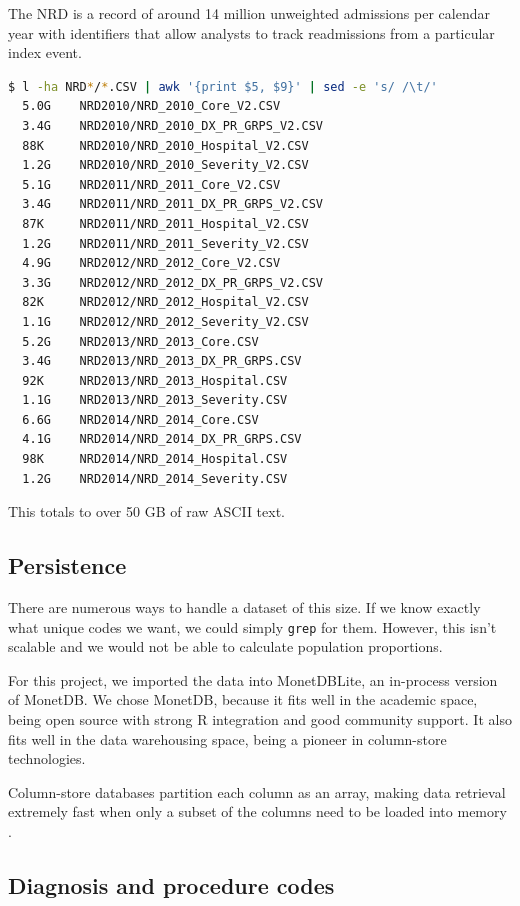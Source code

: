 \documentclass[12pt]{ociamthesis}\usepackage[]{graphicx}\usepackage[]{color}
\begin{document}
The NRD is a record of around 14 million unweighted admissions per calendar year with identifiers that allow analysts 
to track readmissions from a particular index event.

\begin{lstlisting}[language=Bash,caption={Showing file sizes for the NRD dataset from 2010-2014},captionpos=b]
  $ l -ha NRD*/*.CSV | awk '{print $5, $9}' | sed -e 's/ /\t/'
  5.0G    NRD2010/NRD_2010_Core_V2.CSV
  3.4G    NRD2010/NRD_2010_DX_PR_GRPS_V2.CSV
  88K     NRD2010/NRD_2010_Hospital_V2.CSV
  1.2G    NRD2010/NRD_2010_Severity_V2.CSV
  5.1G    NRD2011/NRD_2011_Core_V2.CSV
  3.4G    NRD2011/NRD_2011_DX_PR_GRPS_V2.CSV
  87K     NRD2011/NRD_2011_Hospital_V2.CSV
  1.2G    NRD2011/NRD_2011_Severity_V2.CSV
  4.9G    NRD2012/NRD_2012_Core_V2.CSV
  3.3G    NRD2012/NRD_2012_DX_PR_GRPS_V2.CSV
  82K     NRD2012/NRD_2012_Hospital_V2.CSV
  1.1G    NRD2012/NRD_2012_Severity_V2.CSV
  5.2G    NRD2013/NRD_2013_Core.CSV
  3.4G    NRD2013/NRD_2013_DX_PR_GRPS.CSV
  92K     NRD2013/NRD_2013_Hospital.CSV
  1.1G    NRD2013/NRD_2013_Severity.CSV
  6.6G    NRD2014/NRD_2014_Core.CSV
  4.1G    NRD2014/NRD_2014_DX_PR_GRPS.CSV
  98K     NRD2014/NRD_2014_Hospital.CSV
  1.2G    NRD2014/NRD_2014_Severity.CSV
\end{lstlisting}

This totals to over 50 GB of raw ASCII text. 

\subsection{Persistence}

There are numerous ways to handle a dataset of this size. If we know exactly what unique codes we want,
we could simply \texttt{grep} for them. However, this isn't scalable and we would not be able to calculate
population proportions.

For this project, we imported the data into MonetDBLite, an in-process version of MonetDB. 
We chose MonetDB, because it fits well in the academic space, being open source with strong R 
integration and good community support.
It also fits well in the data warehousing space, being a pioneer in column-store technologies. 

Column-store databases partition each column as an array, making data retrieval extremely fast when
only a subset of the columns need to be loaded into memory \cite{MonetDB}.

\subsection{Diagnosis and procedure codes}
\end{document}
